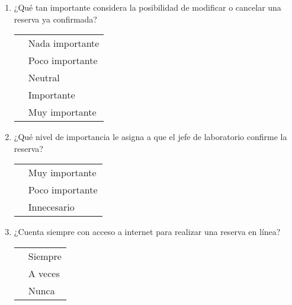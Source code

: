 \documentclass[12pt, a4paper]{article}
\newcommand{\checkbox}{\fbox{\rule{0pt}{1.5ex}\rule{1.5ex}{0pt}}}
\begin{document}
\begin{enumerate}[label=\textbf{P\arabic*}.]
                                    \item ¿Qué tan importante considera la posibilidad de modificar o cancelar una reserva ya confirmada?  \\
                                        \begin{tabular}{ll}
                                        \checkbox & Nada importante \\
                                            \checkbox & Poco importante \\
                                            \checkbox & Neutral \\
                                            \checkbox & Importante \\
                                            \checkbox & Muy importante \\
                                            \end{tabular}

                                            \item ¿Qué nivel de importancia le asigna a que el jefe de laboratorio confirme la reserva?  \\
                                                \begin{tabular}{ll}
                                                \checkbox & Muy importante \\
                                                    \checkbox & Poco importante \\
                                                    \checkbox & Innecesario \\
                                                    \end{tabular}

                                                    \item ¿Cuenta siempre con acceso a internet para realizar una reserva en línea?  \\
                                                        \begin{tabular}{ll}
                                                        \checkbox & Siempre \\
                                                            \checkbox & A veces \\
                                                            \checkbox & Nunca \\
                                                            \end{tabular}


\end{enumerate}
\end{document}
